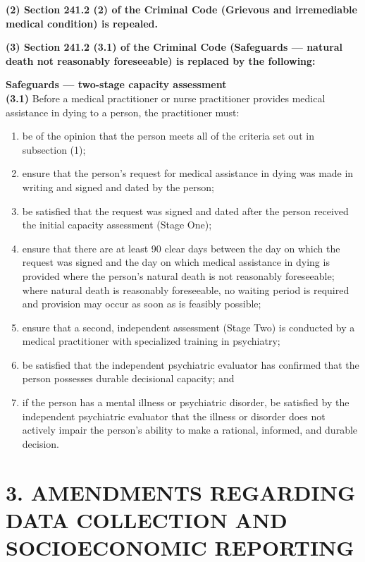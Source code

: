\documentclass[11pt]{article}
\begin{document}
\textbf{(2) Section 241.2 (2) of the Criminal Code (Grievous and irremediable medical condition) is repealed.}

\vspace{1em}
\noindent \textbf{(3) Section 241.2 (3.1) of the Criminal Code (Safeguards — natural death not reasonably foreseeable) is replaced by the following:}

\vspace{0.5em}
\noindent \textbf{Safeguards — two-stage capacity assessment} \\
\textbf{(3.1)} Before a medical practitioner or nurse practitioner provides medical assistance in dying to a person, the practitioner must:
\begin{enumerate}
    \item[(a)] be of the opinion that the person meets all of the criteria set out in subsection (1);
    \item[(b)] ensure that the person’s request for medical assistance in dying was made in writing and signed and dated by the person;
    \item[(c)] be satisfied that the request was signed and dated after the person received the initial capacity assessment (Stage One);
    \item[(d)] ensure that there are at least 90 clear days between the day on which the request was signed and the day on which medical assistance in dying is provided where the person's natural death is not reasonably foreseeable; where natural death is reasonably foreseeable, no waiting period is required and provision may occur as soon as is feasibly possible;
    \item[(e)] ensure that a second, independent assessment (Stage Two) is conducted by a medical practitioner with specialized training in psychiatry;
    \item[(f)] be satisfied that the independent psychiatric evaluator has confirmed that the person possesses durable decisional capacity; and
    \item[(g)] if the person has a mental illness or psychiatric disorder, be satisfied by the independent psychiatric evaluator that the illness or disorder does not actively impair the person's ability to make a rational, informed, and durable decision.
\end{enumerate}

\section*{3. AMENDMENTS REGARDING DATA COLLECTION AND SOCIOECONOMIC REPORTING}
\end{document}
